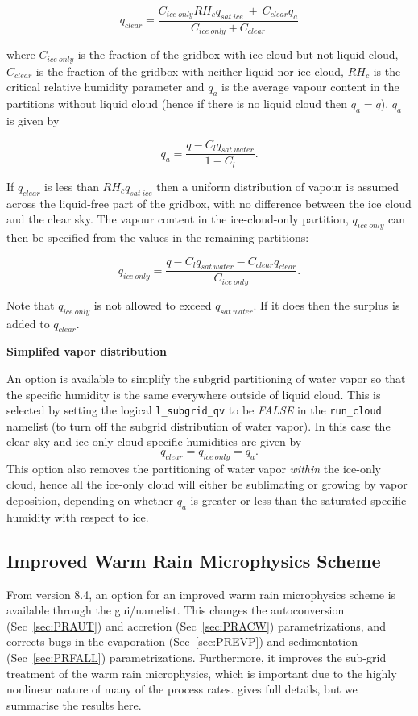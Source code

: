 \documentclass{UMDP_article}
\def\bq{\begin{equation}}
\def\eq{\end{equation}}
\begin{document}
\bq
q_{clear} = \frac { C_{ice~only} RH_{c} q_{sat~ice}  ~+~ C_{clear} q_a }
{C_{ice~only}+C_{clear} }
\eq

where $C_{ice~only}$ is the fraction of the gridbox with ice cloud but not 
liquid cloud, $C_{clear}$ is the fraction of the gridbox with neither liquid 
nor ice cloud, $RH_c$ is the critical relative humidity parameter and
$q_a$ is the average vapour content in the partitions without liquid cloud 
(hence if there is no liquid cloud then $q_a = q$). $q_{a}$ is given by
 
\bq
q_a = \frac { q -  C_l q_{sat~water} } {1 - C_l} .
\eq

If $q_{clear}$ is less than $RH_c q_{sat~ice}$ then a uniform distribution 
of vapour is assumed across the liquid-free part of the gridbox, with no 
difference between the ice cloud and the clear sky. The vapour content in the
ice-cloud-only partition, $q_{ice~only}$ can then be specified from the values 
in the remaining partitions:

\bq
q_{ice~only} = \frac { q - C_l q_{sat~water} - C_{clear} q_{clear} } 
{ C_{ice~only}} .
\eq

Note that $q_{ice~only}$ is not allowed to exceed $q_{sat~water}$. If it does 
then the surplus is added to $q_{clear}$.

\textbf{Simplifed vapor distribution}

An option is available to simplify the subgrid partitioning of
water vapor so that the specific humidity is the same
everywhere outside of liquid cloud.
This is selected by setting the logical \verb!l_subgrid_qv!
to be {\it FALSE} in the \verb!run_cloud! namelist
(to turn off the subgrid distribution of water vapor).
In this case the clear-sky and ice-only cloud
specific humidities are given by
\bq
 q_{clear} =  q_{ice~only} = q_a.
\eq
This option also removes the partitioning of water vapor
{\it within} the ice-only cloud, hence all the ice-only cloud
will either be sublimating or growing by vapor deposition,
depending on whether $q_a$ is greater or less than
the saturated specific humidity with respect to ice.

\subsection{Improved Warm Rain Microphysics Scheme}\label{sec:warmnew}

From version 8.4, an option for an improved warm rain microphysics
scheme is available through the gui/namelist. This changes the autoconversion
(Sec~\ref{sec:PRAUT}) and accretion (Sec~\ref{sec:PRACW})
parametrizations, and corrects bugs in the evaporation
(Sec~\ref{sec:PREVP}) and sedimentation (Sec~\ref{sec:PRFALL})
parametrizations. Furthermore, it improves the sub-grid treatment of
the warm rain microphysics, which is important due to the highly
nonlinear nature of many of the process rates. \cite{boutle:etal:2014}
gives full details, but we summarise the results here.
\end{document}
